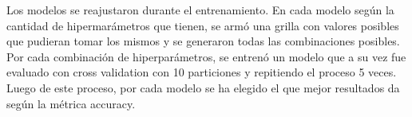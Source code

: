 Los modelos se reajustaron durante el entrenamiento. En cada modelo según la cantidad de hipermarámetros que tienen, se armó una grilla con valores posibles que pudieran tomar los mismos y se generaron todas las combinaciones posibles. Por cada combinación de hiperparámetros, se entrenó un modelo que a su vez fue evaluado con cross validation con 10 particiones y repitiendo el proceso 5 veces. Luego de este proceso, por cada modelo se ha elegido el que mejor resultados da según la métrica accuracy.
